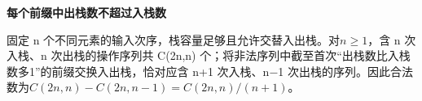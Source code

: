 {\color{ink}\bfseries 每个前缀中出栈数不超过入栈数}\par\vspace{1bp}固定 n 个不同元素的输入次序，栈容量足够且允许交替入出栈。对\(n\ge 1\)，含 n 次入栈、n 次出栈的操作序列共 C(2n,\allowbreak{}n) 个；将非法序列中截至首次“出栈数比入栈数多1”的前缀交换入出栈，恰对应含 n+\allowbreak{}1 次入栈、n\(-\)1 次出栈的序列。因此合法数为\(C(2n,\allowbreak{}n)-C(2n,\allowbreak{}n-1)=\allowbreak{}C(2n,\allowbreak{}n)/\allowbreak{}(n+\allowbreak{}1)\)。

